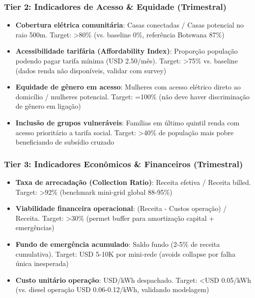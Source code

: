 \documentclass[12pt, a4paper]{article}
\begin{document}
\subsubsection{Tier 2: Indicadores de Acesso \& Equidade (Trimestral)}
\begin{itemize}
\item \textbf{Cobertura elétrica comunitária}: Casas conectadas / Casas potencial no raio 500m. Target: >80\% (vs. baseline 0\%, referência Botswana 87\%)
\item \textbf{Acessibilidade tarifária (Affordability Index)}: Proporção população podendo pagar tarifa mínima (USD 2.50/mês). Target: >75\% vs. baseline (dados renda não disponíveis, validar com survey)
\item \textbf{Equidade de gênero em acesso}: Mulheres com acesso elétrico direto ao domicílio / mulheres potencial. Target: =100\% (não deve haver discriminação de gênero em ligação)
\item \textbf{Inclusão de grupos vulneráveis}: Famílias em último quintil renda com acesso prioritário a tarifa social. Target: >40\% de população mais pobre beneficiando de subsídio cruzado
\end{itemize}

\subsubsection{Tier 3: Indicadores Econômicos \& Financeiros (Trimestral)}
\begin{itemize}
\item \textbf{Taxa de arrecadação (Collection Ratio)}: Receita efetiva / Receita billed. Target: >92\% (benchmark mini-grid global 88-95\%)
\item \textbf{Viabilidade financeira operacional}: (Receita - Custos operação) / Receita. Target: >30\% (permet buffer para amortização capital + emergências)
\item \textbf{Fundo de emergência acumulado}: Saldo fundo (2-5\% de receita cumulativa). Target: USD 5-10K por mini-rede (avoids collapse por falha única inesperada)
\item \textbf{Custo unitário operação}: USD/kWh despachado. Target: <USD 0.05/kWh (vs. diesel operação USD 0.06-0.12/kWh, validando modelagem)
\end{itemize}
\end{document}
